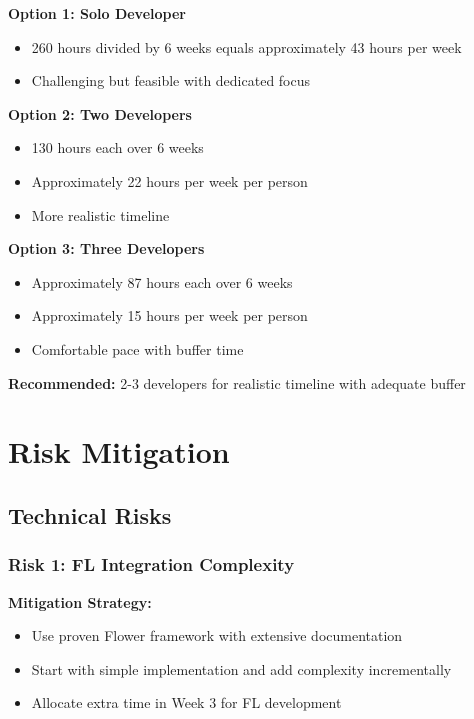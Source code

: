 \documentclass[12pt,a4paper]{article}
\begin{document}
\textbf{Option 1: Solo Developer}
\begin{itemize}[leftmargin=1cm,itemsep=0pt]
    \item 260 hours divided by 6 weeks equals approximately 43 hours per week
    \item Challenging but feasible with dedicated focus
\end{itemize}

\textbf{Option 2: Two Developers}
\begin{itemize}[leftmargin=1cm,itemsep=0pt]
    \item 130 hours each over 6 weeks
    \item Approximately 22 hours per week per person
    \item More realistic timeline
\end{itemize}

\textbf{Option 3: Three Developers}
\begin{itemize}[leftmargin=1cm,itemsep=0pt]
    \item Approximately 87 hours each over 6 weeks
    \item Approximately 15 hours per week per person
    \item Comfortable pace with buffer time
\end{itemize}

\textbf{Recommended:} 2-3 developers for realistic timeline with adequate buffer

\section{Risk Mitigation}

\subsection{Technical Risks}

\subsubsection{Risk 1: FL Integration Complexity}

\textbf{Mitigation Strategy:}
\begin{itemize}[leftmargin=1cm,itemsep=0pt]
    \item Use proven Flower framework with extensive documentation
    \item Start with simple implementation and add complexity incrementally
    \item Allocate extra time in Week 3 for FL development
\end{itemize}
\end{document}
